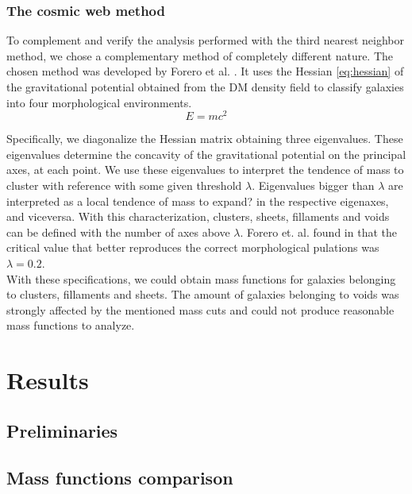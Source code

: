\documentclass[a4paper,fleqn,usenatbib]{mnras}
\begin{document}
\subsubsection{The cosmic web method}
To complement and verify the analysis performed with the third nearest neighbor method, we chose a complementary method of completely different nature. 
The chosen method was developed by Forero et al. \cite{forero1}. 
It uses the Hessian \ref{eq:hessian} of the gravitational potential obtained from the DM density field to classify galaxies into four morphological environments.\\  

\begin{equation}
E =  mc^2
\label{eq:hessian}
\end{equation}

Specifically, we diagonalize the Hessian matrix obtaining three eigenvalues. 
These eigenvalues determine the concavity of the gravitational potential on the principal axes, at each point. We use these eigenvalues to interpret the tendence of mass to cluster with reference with some given threshold $\lambda$. 
Eigenvalues bigger than $\lambda$ are interpreted as a local tendence of mass to expand? in the respective eigenaxes, and viceversa. 
With this characterization, clusters, sheets, fillaments and voids can be defined with the number of axes above $\lambda$.
Forero et. al. found in \cite{forero2009} that the critical value that better reproduces the correct morphological pulations was $\lambda = 0.2$. \\

With these specifications, we could obtain mass functions for galaxies belonging to clusters, fillaments and sheets. The amount of galaxies belonging to voids was strongly affected by the mentioned mass cuts and could not produce reasonable mass functions to analyze.


\section{Results}
\subsection{Preliminaries}

\subsection{Mass functions comparison}
\end{document}
